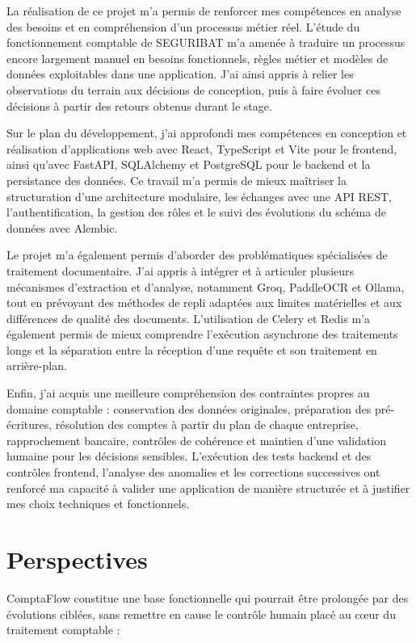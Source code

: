 \documentclass[12pt,a4paper,oneside]{report}
\begin{document}
La réalisation de ce projet m'a permis de renforcer mes compétences en analyse
des besoins et en compréhension d'un processus métier réel. L'étude du
fonctionnement comptable de SEGURIBAT m'a amenée à traduire un processus encore
largement manuel en besoins fonctionnels, règles métier et modèles de données
exploitables dans une application. J'ai ainsi appris à relier les observations
du terrain aux décisions de conception, puis à faire évoluer ces décisions à
partir des retours obtenus durant le stage.

Sur le plan du développement, j'ai approfondi mes compétences en conception et
réalisation d'applications web avec React, TypeScript et Vite pour le frontend,
ainsi qu'avec FastAPI, SQLAlchemy et PostgreSQL pour le backend et la
persistance des données. Ce travail m'a permis de mieux maîtriser la
structuration d'une architecture modulaire, les échanges avec une API REST,
l'authentification, la gestion des rôles et le suivi des évolutions du schéma de
données avec Alembic.

Le projet m'a également permis d'aborder des problématiques spécialisées de
traitement documentaire. J'ai appris à intégrer et à articuler plusieurs
mécanismes d'extraction et d'analyse, notamment Groq, PaddleOCR et Ollama, tout
en prévoyant des méthodes de repli adaptées aux limites matérielles et aux
différences de qualité des documents. L'utilisation de Celery et Redis m'a
également permis de mieux comprendre l'exécution asynchrone des traitements
longs et la séparation entre la réception d'une requête et son traitement en
arrière-plan.

Enfin, j'ai acquis une meilleure compréhension des contraintes propres au
domaine comptable : conservation des données originales, préparation des
pré-écritures, résolution des comptes à partir du plan de chaque entreprise,
rapprochement bancaire, contrôles de cohérence et maintien d'une validation
humaine pour les décisions sensibles. L'exécution des tests backend et des
contrôles frontend, l'analyse des anomalies et les corrections successives ont
renforcé ma capacité à valider une application de manière structurée et à
justifier mes choix techniques et fonctionnels.

\section{Perspectives}

ComptaFlow constitue une base fonctionnelle qui pourrait être prolongée par des
évolutions ciblées, sans remettre en cause le contrôle humain placé au cœur du
traitement comptable :
\end{document}
